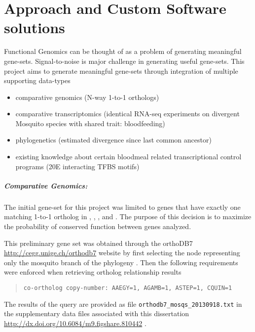 
\chapter{Approach and Custom Software solutions} \label{chap:3}


Functional Genomics can be thought of as a problem of generating meaningful gene-sets.
Signal-to-noise is major challenge in generating useful gene-sets. This project aims to generate meaningful gene-sets through integration of multiple supporting data-types

\begin{itemize}
    \item comparative genomics (N-way 1-to-1 orthologs)
    \item comparative transcriptomics (identical RNA-seq experiments on divergent Mosquito species with shared trait: bloodfeeding)
    \item phylogenetics (estimated divergence since last common ancestor)
    \item existing knowledge about certain bloodmeal related transcriptional control programs (\gls{20E} interacting \gls{TFBS} motifs)
\end{itemize}




\paragraph*{Comparative Genomics:}

The initial gene-set for this project was limited to genes that have exactly one matching 1-to-1 ortholog in \Aa, \Ag, \As, and \Cq.
The purpose of this decision is to maximize the probability of conserved function between genes analyzed. 

This preliminary gene set was obtained through the orthoDB7 \url{http://cegg.unige.ch/orthodb7} website by first selecting the node representing only the mosquito branch of the phylogeny \cite{Waterhouse2013}.
Then the following requirements were enforced when retrieving ortholog relationship results 

\begin{quotation}
    \texttt{co-ortholog copy-number: AAEGY=1, AGAMB=1, ASTEP=1, CQUIN=1}
\end{quotation}


The results of the query are provided as file \texttt{orthodb7\_mosqs\_20130918.txt} in the supplementary data files associated with this dissertation \url{http://dx.doi.org/10.6084/m9.figshare.810442} \cite{Dunn2013dissSupl}.
 
